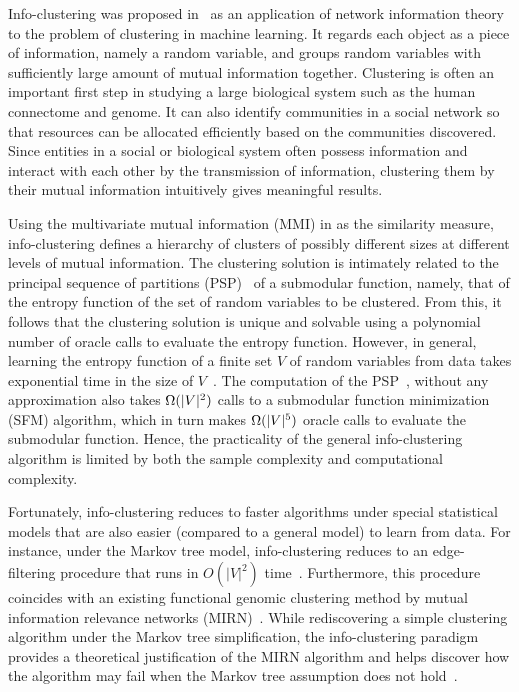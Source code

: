\documentclass[conference,letterpaper]{IEEEtran}
\begin{document}
Info-clustering was proposed in~\cite{chan16cluster} as an application of network information theory
to the problem of clustering in machine learning. It regards each object as a piece of information,
namely a random variable, and groups random variables with sufficiently large amount of mutual
information together. Clustering is often an important first step in studying a large biological
system such as the human connectome and genome. It can also identify communities in a social network
so that resources can be allocated efficiently based on the communities discovered.
Since entities in a social or biological system often possess information and interact with each
other by the transmission of information, clustering them by their mutual information intuitively
gives meaningful results.

Using the multivariate mutual information (MMI) in \cite{chan15mi} as the similarity measure,
info-clustering defines a hierarchy of clusters of possibly different sizes at different levels of
mutual information. The clustering solution is intimately related to the principal sequence of partitions
(PSP)~\cite{narayanan90} of a submodular function, namely, that of the entropy function of the set of random
variables to be clustered. From this, it follows that the clustering solution is unique and solvable
using a polynomial number of oracle calls to evaluate the entropy function. However, in general,
learning the entropy function of a finite set $V$ of random variables from data takes exponential
time in the size of $V$~\cite{wu16}. The computation of the
PSP~\cite{narayanan90,nagano10}, \cite[Algorithm~3]{chan16cluster} without any approximation also
takes $\Omega(\lvert V\rvert^2)$ calls to a submodular function minimization (SFM) algorithm, which in
turn makes $\Omega(\lvert V\rvert^5)$ oracle calls to evaluate the submodular function. Hence, the
practicality of the general info-clustering algorithm is limited by both the sample complexity and
computational complexity. 

Fortunately, info-clustering reduces to faster algorithms under special statistical models that are
also easier (compared to a general model) to learn from data. For instance, under the Markov tree
model, info-clustering reduces to an edge-filtering procedure that runs in $O(|V|^2)$
time~\cite{chan15allerton}. Furthermore, this procedure coincides with an existing functional
genomic clustering method by mutual information relevance networks (MIRN)~\cite{butte00}. While
rediscovering a simple clustering algorithm under the Markov tree simplification, the info-clustering paradigm provides a theoretical
justification of the MIRN algorithm and helps discover how the algorithm may fail when the Markov tree
assumption does not hold~\cite[Example~6]{chan16cluster}.
\end{document}
